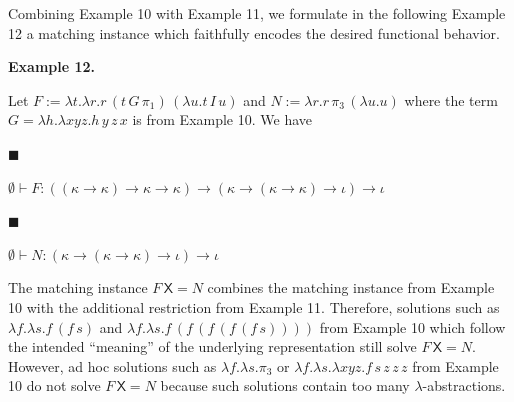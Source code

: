  
 
 
Combining Example 10 with Example 11, we formulate in the following Example 12 a matching instance which faithfully encodes the desired functional behavior.\par
 
 
 
\par\medskip\noindent\textbf{Example 12.}\par
 
 
Let $F:=\lambda t.\lambda r.r\,(t\,G\,\pi_{1})\,(\lambda u.t\,I\,u)$ and $N:=\lambda r.r\,\pi_{3}\,(\lambda u.u)$ where the term $G=\lambda h.\lambda xyz.h\,y\,z\,x$ is from Example 10. We have\par
  
\par\noindent  $\blacksquare$ 
 
$\emptyset\vdash F:((\kappa\to\kappa)\to\kappa\to\kappa)\to(\kappa\to(\kappa\to%
\kappa)\to\iota)\to\iota$\par
 
 
 
\par\noindent  $\blacksquare$ 
 
$\emptyset\vdash N:(\kappa\to(\kappa\to\kappa)\to\iota)\to\iota$\par
 
 
  
The matching instance $F\,\mathsf{X}=N$ combines the matching instance from Example 10 with the additional restriction from Example 11. Therefore, solutions such as $\lambda f.\lambda s.f\,(f\,s)$ and $\lambda f.\lambda s.f\,(f\,(f\,(f\,(f\,s))))$ from Example 10 which follow the intended “meaning” of the underlying representation still solve $F\,\mathsf{X}=N$. However, ad hoc solutions such as $\lambda f.\lambda s.\pi_{3}$ or $\lambda f.\lambda s.\lambda xyz.f\,s\,z\,z\,z$ from Example 10 do not solve $F\,\mathsf{X}=N$ because such solutions contain too many $\lambda$-abstractions.\par
 
 
 
